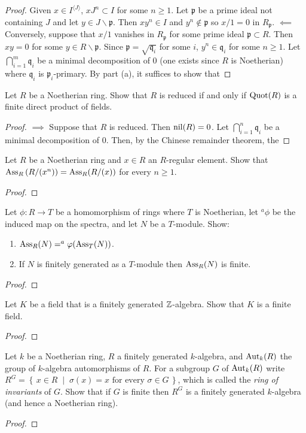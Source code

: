 \begin{proof}
Given $x\in I^{\langle J\rangle}$, $xJ^n\subset I$ for some
$n\geq 1$. Let $\mathfrak{p}$ be a prime ideal not containing $J$
and let $y\in J\smallsetminus\mathfrak{p}$. Then $xy^n\in I$ and
$y^n\notin\mathfrak{p}$ so $x/1=0$ in
$R_{\mathfrak{p}}$. $\impliedby$ Conversely, suppose that $x/1$
vanishes in $R_{\mathfrak{p}}$ for some prime ideal
$\mathfrak{p}\subset R$. Then $xy=0$ for some
$y\in R\smallsetminus\mathfrak{p}$. Since
$\mathfrak{p}=\sqrt{\mathfrak{q}_i}$ for some $i$,
$y^n\in\mathfrak{q}_i$ for some $n\geq 1$. Let
$\bigcap_{i=1}^m\mathfrak{q}_i$ be a minimal decomposition of $0$
(one exists since $R$ is Noetherian) where $\mathfrak{q}_i$ is
$\mathfrak{p}_i$-primary. By part (a), it suffices to show that
\end{proof}
\newpage
\begin{problem}
Let $R$ be a Noetherian ring. Show that $R$ is reduced if and
only if $\operatorname{Quot}(R)$ is a finite direct product of fields.
\end{problem}
\begin{proof}
$\implies$ Suppose that $R$ is reduced. Then $\operatorname{nil}(R)=0$. Let
$\bigcap_{i=1}^n\mathfrak{q}_i$ be a minimal decomposition of
$0$. Then, by the Chinese remainder theorem, the
\end{proof}
\newpage
\begin{problem}
Let $R$ be a Noetherian ring and $x\in R$ an $R$-regular
element. Show that $\operatorname{Ass}_R\left(R/(x^n)\right)=\operatorname{Ass}_R(R/(x))$ for
every $n\geq 1$.
\end{problem}
\begin{proof}
\end{proof}
\newpage
\begin{problem}
Let $\phi\colon R\to T$ be a homomorphism of rings where $T$ is
Noetherian, let $^a\phi$ be the induced map on the spectra, and
let $N$ be a $T$-module. Show:
\begin{enumerate}[label=(\alph*)]
\item $\operatorname{Ass}_R(N)=^a\varphi(\operatorname{Ass}_T(N))$.
\item If $N$ is finitely generated as a $T$-module then
  $\operatorname{Ass}_R(N)$ is finite.
\end{enumerate}
\end{problem}
\begin{proof}
\end{proof}
\newpage
\begin{problem}
Let $K$ be a field that is a finitely generated
$\mathbb{Z}$-algebra. Show that $K$ is a finite field.
\end{problem}
\begin{proof}
\end{proof}
\newpage
\begin{problem}
Let $k$ be a Noetherian ring, $R$ a finitely generated
$k$-algebra, and $\operatorname{Aut}_k(R)$ the group of $k$-algebra
automorphisms of $R$. For a subgroup $G$ of $\operatorname{Aut}_k(R)$ write
$R^G=\left\{\,x\in R\;\middle|\;\text{$\sigma(x)=x$ for every
    $\sigma\in G$}\,\right\}$, which is called the \emph{ring of
  invariants} of $G$. Show that if $G$ is finite then $R^G$ is a
finitely generated $k$-algebra (and hence a Noetherian ring).
\end{problem}
\begin{proof}
\end{proof}

